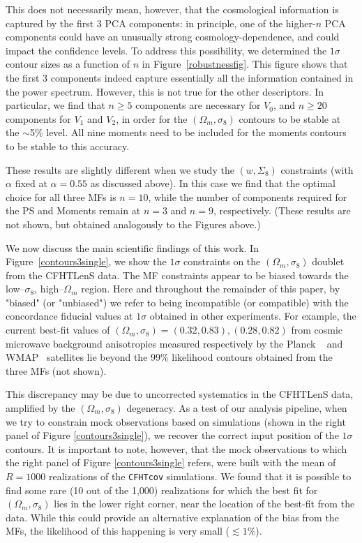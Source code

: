 \documentclass[reprint,aps,prd,superscriptaddress,showkeys,showpacs]{revtex4-1}
\begin{document}
This does not necessarily mean, however, that the cosmological
information is captured by the first 3 PCA components: in principle,
one of the higher-$n$ PCA components could have an unusually strong
cosmology-dependence, and could impact the confidence levels.  To
address this possibility, we determined the $1\sigma$ contour sizes as
a function of $n$ in Figure~\ref{robustnessfig}.  This figure shows
that the first 3 components indeed capture essentially all the
information contained in the power spectrum. However, this is not true
for the other descriptors. In particular, we find that $n\geq5$
components are necessary for $V_0$, and $n\geq20$ components for $V_1$
and $V_2$, in order for the $(\Omega_m,\sigma_8)$ contours to be
stable at the $\sim$5\% level. All nine moments need to be included
for the moments contours to be stable to this accuracy.

These results are slightly different when we study the $(w,\Sigma_8)$
constraints (with $\alpha$ fixed at $\alpha=0.55$ as discussed
above). In this case we find that the optimal choice for all three MFs
is $n=10$, while the number of components required for the PS and
Moments remain at $n=3$ and $n=9$, respectively. (These results are
not shown, but obtained analogously to the Figures above.)

We now discuss the main scientific findings of this work. In
Figure~\ref{contours3single}, we show the $1\sigma$ constraints on the
$(\Omega_m,\sigma_8)$ doublet from the CFHTLenS data. The MF
constraints appear to be biased towards the low--$\sigma_8$,
high--$\Omega_m$ region. Here and throughout the remainder of this
paper, by "biased" (or "unbiased") we refer to being incompatible (or
compatible) with the concordance fiducial values at $1\sigma$ obtained
in other experiments. For example, the current best-fit values of
$(\Omega_m,\sigma_8)=(0.32,0.83),(0.28,0.82)$ from cosmic microwave background
anisotropies measured respectively by the Planck
~\citep{PlanckXVI2013} and WMAP~\citep{WMAP9} satellites lie beyond the 99\% likelihood
contours obtained from the three MFs (not shown).

This discrepancy may be due to uncorrected systematics in the CFHTLenS
data, amplified by the $(\Omega_m,\sigma_8)$ degeneracy.  As a test of
our analysis pipeline, when we try to constrain mock observations
based on simulations (shown in the
right panel of Figure \ref{contours3single}), we recover the correct
input position of the $1\sigma$ contours.  It is important to note,
however, that the mock observations to which the right panel of Figure
\ref{contours3single} refers, were built with the mean of $R=1000$
realizations of the \texttt{CFHTcov} simulations. We found that it is
possible to find some rare (10 out of the 1,000) realizations for
which the best fit for $(\Omega_m,\sigma_8)$ lies in the lower right
corner, near the location of the best-fit from the data. While this
could provide an alternative explanation of the bias from the MFs, the
likelihood of this happening is very small ($\lesssim1\%$).
\end{document}
